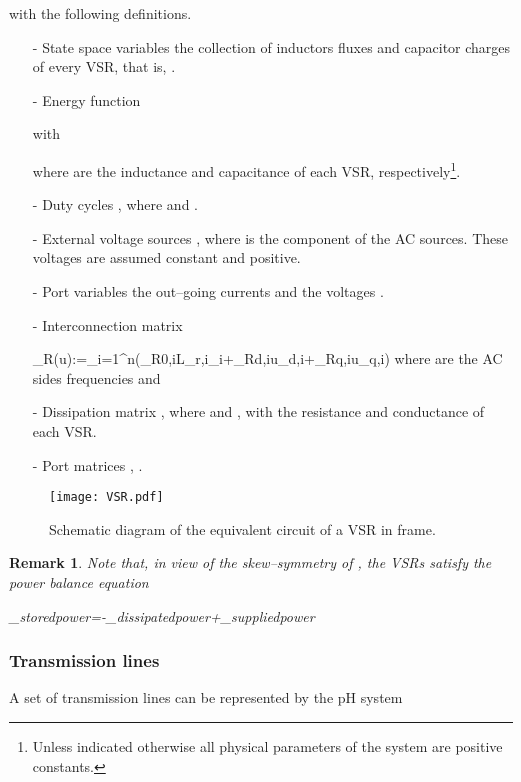 \documentclass[5p,twocolumn]{elsarticle}
\def\begequ{}
\def\lab{\label}
\def\begrem{\begin{remark}\rm}
\def\endrem{\end{remark}}
\newtheorem{remark}[theorem]{Remark}
\numberwithin{equation}{section}
\begin{document}
with the following definitions.
\begin{itemize}
\item[-] State space variables the collection of inductors fluxes  and capacitor charges  of every VSR, that is, .

\item[-] Energy function 

with


where  are the inductance and capacitance of each VSR, respectively\footnote{Unless indicated otherwise all physical parameters of the system are positive constants.}.

\item[-] Duty cycles , where  and .

\item[-] External voltage sources , where  is the  component of the AC sources. These voltages are assumed constant and positive.

\item[-] Port variables the out--going currents  and the voltages .

\item[-] Interconnection matrix
\begequ
\label{Jdecomp}
_{R}(u):=\sum_{i=1}^n(_{R0,i}L_{r,i}\omega_i+_{Rd,i}u_{d,i}+_{Rq,i}u_{q,i})
\endequ
 where  are the AC sides frequencies and

\item[-] Dissipation matrix , where  and  , with  the resistance and conductance of each VSR.

\item[-] Port matrices , .
\end{itemize}
\begin{figure}[ht]
 \centering
\texttt{[image: VSR.pdf]}
 \caption{Schematic diagram of the equivalent circuit of a VSR in  frame.}
 \label{rectifier}
\end{figure}

\begrem
Note that, in view of the skew--symmetry of , the VSRs satisfy the power balance equation
\begequ
\lab{powbal}
_{\mbox{stored\:power}}=-_{\mbox{dissipated\;power}}+_{\mbox{supplied\;power}}
\endequ
\endrem
\subsubsection{Transmission lines}
A set of   transmission lines can be represented by the pH system
\end{document}
